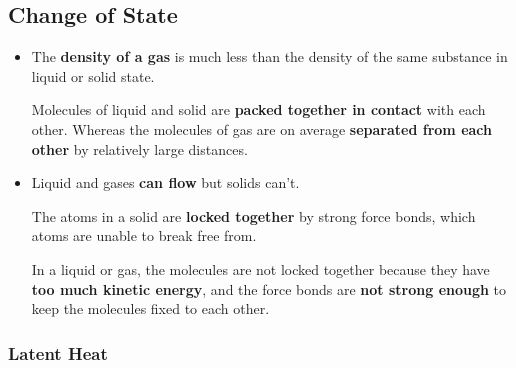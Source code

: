 \subsection{Change of State}

\begin{itemize}
    \item The \textbf{density of a gas} is much less than the density of the same substance in liquid or solid state.

        Molecules of liquid and solid are \textbf{packed together in contact} with each other. Whereas the molecules of gas are on average \textbf{separated from each other} by relatively large distances.
    \item Liquid and gases \textbf{can flow} but solids can't.

        The atoms in a solid are \textbf{locked together} by strong force bonds, which atoms are unable to break free from.

        In a liquid or gas, the molecules are not locked together because they have \textbf{too much kinetic energy}, and the force bonds are \textbf{not strong enough} to keep the molecules fixed to each other.
\end{itemize}

\subsubsection*{Latent Heat}

